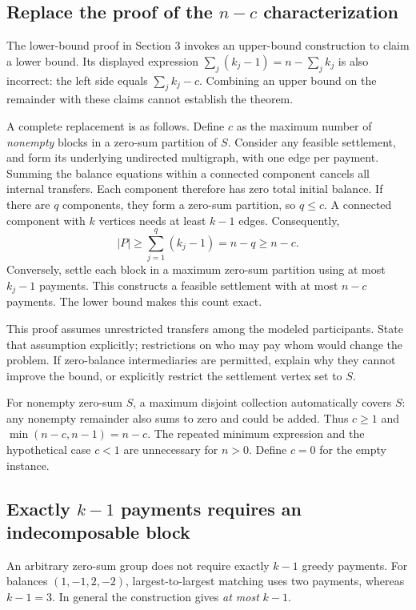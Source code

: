 \documentclass[11pt]{article}
\begin{document}
\subsection{Replace the proof of the $n-c$ characterization}

The lower-bound proof in Section 3 invokes an upper-bound construction
to claim a lower bound. Its displayed expression
$\sum_j(k_j-1)=n-\sum_j k_j$ is also incorrect: the left side equals
$\sum_j k_j-c$. Combining an upper bound on the remainder with these
claims cannot establish the theorem.

A complete replacement is as follows. Define $c$ as the maximum number
of \emph{nonempty} blocks in a zero-sum partition of $S$. Consider any
feasible settlement, and form its underlying undirected multigraph, with
one edge per payment. Summing the balance equations within a connected
component cancels all internal transfers. Each component therefore has
zero total initial balance. If there are $q$ components, they form a
zero-sum partition, so $q\leq c$. A connected component with $k$ vertices
needs at least $k-1$ edges. Consequently,
\[
 |P|\geq\sum_{j=1}^{q}(k_j-1)=n-q\geq n-c.
\]
Conversely, settle each block in a maximum zero-sum partition using at
most $k_j-1$ payments. This constructs a feasible settlement with at most
$n-c$ payments. The lower bound makes this count exact.

This proof assumes unrestricted transfers among the modeled participants.
State that assumption explicitly; restrictions on who may pay whom would
change the problem. If zero-balance intermediaries are permitted, explain
why they cannot improve the bound, or explicitly restrict the settlement
vertex set to $S$.

For nonempty zero-sum $S$, a maximum disjoint collection automatically
covers $S$: any nonempty remainder also sums to zero and could be added.
Thus $c\geq1$ and $\min(n-c,n-1)=n-c$. The repeated minimum expression
and the hypothetical case $c<1$ are unnecessary for $n>0$.
Define $c=0$ for the empty instance.

\subsection{Exactly $k-1$ payments requires an indecomposable block}

An arbitrary zero-sum group does not require exactly $k-1$ greedy payments.
For balances $(1,-1,2,-2)$, largest-to-largest matching uses two payments,
whereas $k-1=3$. In general the construction gives \emph{at most} $k-1$.
\end{document}

